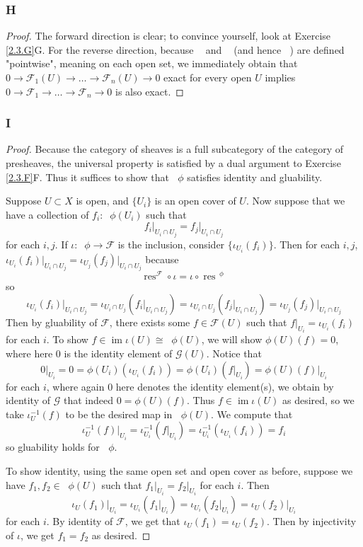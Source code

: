 \documentclass{article}
\newcommand{\fF}{\mathscr{F}}
\newcommand{\fG}{\mathscr{G}}
\DeclareMathOperator{\res}{\mathrm{res}}
\DeclareMathOperator{\im}{\mathrm{im}}
\DeclareMathOperator{\cok}{\mathrm{cok}}
\DeclareMathOperator{\kerpre}{\ker_{\text{pre}}}
\DeclareMathOperator{\cokpre}{\cok_{\text{pre}}}
\DeclareMathOperator{\impre}{\im_{\text{pre}}}
\begin{document}
\subsubsection{H}\label{2.3.H}
\begin{proof}
    The forward direction is clear; to convince yourself, look at Exercise \ref{2.3.G}G. For the reverse direction, because $\kerpre$ and $\cokpre$ (and hence $\impre$) are defined "pointwise", meaning on each open set, we immediately obtain that $0 \to \fF_1(U) \to \dots \to \fF_n(U) \to 0$ exact for every open $U$ implies $0\to \fF_1 \to \dots\to \fF_n \to 0$ is also exact.
\end{proof}
\subsubsection{I}\label{2.3.I}
\begin{proof}
    Because the category of sheaves is a full subcategory of the category of presheaves, the universal property is satisfied by a dual argument to Exercise \ref{2.3.F}F. Thus it suffices to show that $\kerpre \phi$  satisfies identity and gluability.

    Suppose $U\subset X$ is open, and $\{U_i\}$ is an open cover of $U$. Now suppose that we have a collection of $f_i:\kerpre \phi(U_i)$ such that
    \[
    f_i\vert_{U_i\cap U_j}=f_j\vert_{U_i\cap U_j}
    \]
    for each $i,j$. If $\iota:\kerpre \phi\to \fF$ is the inclusion, consider $\{\iota_{U_i}(f_i)\}$. Then for each $i,j$, $\iota_{U_i}(f_i)\vert_{U_i\cap U_j}=\iota_{U_j}(f_j)\vert_{U_i\cap U_j}$ because
    \[
    \res^{\fF} \circ \iota =\iota \circ \res^{\kerpre \phi}
    \]
    so 
    \[
    \iota_{U_i}(f_i)\vert_{U_i\cap U_j}=\iota_{U_i\cap U_j}(f_i\vert_{U_i\cap U_j})=\iota_{U_i\cap U_j}(f_j\vert_{U_i\cap U_j})=\iota_{U_j}(f_j)\vert_{U_i\cap U_j}
    \]
    Then by gluability of $\fF$, there exists some $f\in \fF(U)$ such that $f\vert_{U_i}=\iota_{U_i}(f_i)$ for each $i$. To show $f\in \im \iota(U) \cong \kerpre\phi(U)$, we will show $\phi(U)(f)=0$, where here $0$ is the identity element of $\fG(U)$. Notice that
    \[
    0\vert_{U_i}=0=\phi(U_i)(\iota_{U_i}(f_i))=\phi(U_i)(f\vert_{U_i})=\phi(U)(f)\vert_{U_i}
    \]
    for each $i$, where again $0$ here denotes the identity element(s), we obtain by identity of $\fG$ that indeed $0=\phi(U)(f)$. Thus $f\in \im \iota(U)$ as desired, so we take $\iota^{-1}_U(f)$ to be the desired map in $\kerpre\phi(U)$. We compute that
    \[
    \iota^{-1}_U(f)\vert_{U_i}=\iota^{-1}_{U_i}(f\vert_{U_i})=\iota^{-1}_{U_i}(\iota_{U_i}(f_i))=f_i
    \]
    so gluability holds for $\kerpre\phi$.

    To show identity, using the same open set and open cover as before, suppose we have $f_1,f_2\in \kerpre\phi(U)$ such that $f_1\vert_{U_i}=f_2\vert_{U_i}$ for each $i$. Then \[
    \iota_U(f_1)\vert_{U_i}=\iota_{U_i}(f_1\vert_{U_i})=\iota_{U_i}(f_2\vert_{U_i})=\iota_U(f_2)\vert_{U_i}
    \]
    for each $i$. By identity of $\fF$, we get that $\iota_U(f_1)=\iota_U(f_2)$. Then by injectivity of $\iota$, we get $f_1=f_2$ as desired.
\end{proof}
\end{document}
